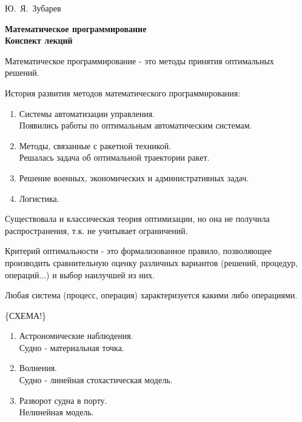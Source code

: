 \documentclass[12pt,a5paper]{scrbook}
\begin{document}
  \pagestyle{plain}
  \begin{titlepage}
    \begin{center}
      \Huge{Ю.~Я.~Зубарев}
    \end{center}
    \vfill
    \vfill
    \begin{center}
      \Large{\textbf{Математическое программирование\\
      Конспект лекций}}
    \end{center}
    \vfill
    \vfill
    \vfill
    \restoregeometry
  \end{titlepage}
  \tableofcontents
  \newpage
  Математическое программирование - это методы принятия оптимальных решений.\par
  История развития методов математического программирования:
  \begin{enumerate}
    \item Системы автоматизации управления.\\Появились работы по оптимальным автоматическим системам.
    \item Методы, связанные с ракетной техникой.\\Решалась задача об оптимальной траектории ракет.
    \item Решение военных, экономических и административных задач.
    \item Логистика.
  \end{enumerate}\par
  Существовала и классическая теория оптимизации, но она не получила распространения, т.к. не учитывает ограничений.\par
  Критерий оптимальности - это формализованное правило, позволяющее производить сравнительную оценку различных вариантов (решений, процедур, операций...) и выбор наилучшей из них.\par
  Любая система (процесс, операция) характеризуется какими либо операциями.\par
\{СХЕМА!\}
  \begin{enumerate}
    \item Астрономические наблюдения.\\Судно - материальная точка.
    \item Волнения.\\Судно - линейная стохастическая модель.
    \item Разворот судна в порту.\\Нелинейная модель.
  \end{enumerate}\par
\end{document}
